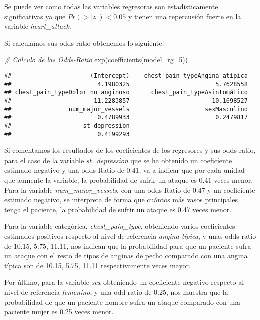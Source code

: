 \documentclass[
]{article}
\newenvironment{Shaded}{\begin{snugshade}}{\end{snugshade}}
\newcommand{\CommentTok}[1]{\textcolor[rgb]{0.56,0.35,0.01}{\textit{#1}}}
\newcommand{\FunctionTok}[1]{\textcolor[rgb]{0.00,0.00,0.00}{#1}}
\newcommand{\NormalTok}[1]{#1}
\begin{document}
Se puede ver como todas las variables regresoras son estadísticamente
significativas ya que \(Pr(>|z|) < 0.05\) y tienen una repercusión
fuerte en la variable \emph{heart\_attack}.

Si calculamos sus odds ratio obtenemos lo siguiente:

\begin{Shaded}
\begin{Highlighting}[]
\CommentTok{\# Cálculo de las Odds{-}Ratio}
\FunctionTok{exp}\NormalTok{(}\FunctionTok{coefficients}\NormalTok{(model\_rg\_5))}
\end{Highlighting}
\end{Shaded}

\begin{verbatim}
##                      (Intercept)    chest_pain_typeAngina atípica 
##                        4.1980325                        5.7628558 
## chest_pain_typeDolor no anginoso      chest_pain_typeAsintomático 
##                       11.2283857                       10.1698527 
##                num_major_vessels                     sexMasculino 
##                        0.4789933                        0.2479817 
##                    st_depression 
##                        0.4199293
\end{verbatim}

Si comentamos los resultados de los coeficientes de los regresores y sus
odds-ratio, para el caso de la variable \emph{st\_depression} que se ha
obtenido un coeficiente estimado negativo y una odds-Ratio de 0.41, va a
indicar que por cada unidad que aumente la variable, la probabilidad de
sufrir un ataque es 0.41 veces menor. Para la variable
\emph{num\_major\_vessels}, con una odds-Ratio de 0.47 y un coeficiente
estimado negativo, se interpreta de forma que cuántos más vasos
principales tenga el paciente, la probabilidad de sufrir un ataque es
0.47 veces menor.

Para la variable categórica, \emph{chest\_pain\_type}, obteniendo varios
coeficientes estimados positivos respecto al nivel de referencia
\emph{angina típica}, y unas odds-ratio de 10.15, 5.75, 11.11, nos
indican que la probabilidad para que un paciente sufra un ataque con el
resto de tipos de anginas de pecho comparado con una angina típica son
de 10.15, 5.75, 11.11 respectivamente veces mayor.

Por último, para la variable \emph{sex} obteniendo un coeficiente
negativo respecto al nivel de referencia \emph{femenino}, y una
odd-ratio de 0.25, nos muestra que la probabilidad de que un paciente
hombre sufra un ataque comparado con una paciente mujer es 0.25 veces
menor.
\end{document}
